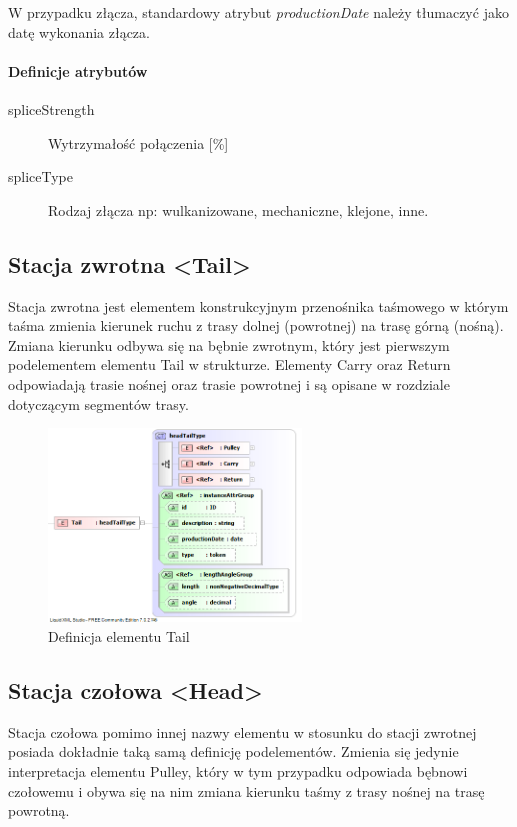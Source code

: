 \documentclass[12pt,a4paper]{article}
\begin{document}
W przypadku złącza, standardowy atrybut \emph{productionDate} należy tłumaczyć
jako datę wykonania złącza.

\paragraph{Definicje atrybutów}
\begin{description}
\item[spliceStrength] Wytrzymałość połączenia [\%]
\item[spliceType] Rodzaj złącza np: wulkanizowane, mechaniczne, klejone, inne.
\end{description}


\subsection{Stacja zwrotna <Tail>}
Stacja zwrotna jest elementem konstrukcyjnym przenośnika taśmowego w którym
taśma zmienia kierunek ruchu z trasy dolnej (powrotnej) na trasę górną (nośną).
Zmiana kierunku odbywa się na bębnie zwrotnym, który jest pierwszym podelementem
elementu Tail w strukturze.  Elementy Carry oraz Return odpowiadają trasie
nośnej oraz trasie powrotnej i są opisane w rozdziale dotyczącym segmentów
trasy.

\begin{figure}[H]
  \centering
  \includegraphics[width=0.6\textwidth]{png/liquid/Tail}
  \caption{Definicja elementu Tail}
  \label{fig:tail-xsd}
\end{figure}


\subsection{Stacja czołowa <Head>}
Stacja czołowa pomimo innej nazwy elementu w stosunku do stacji zwrotnej posiada
dokładnie taką samą definicję podelementów.  Zmienia się jedynie interpretacja
elementu Pulley, który w tym przypadku odpowiada bębnowi czołowemu i obywa się
na nim zmiana kierunku taśmy z trasy nośnej na trasę powrotną.
\end{document}
